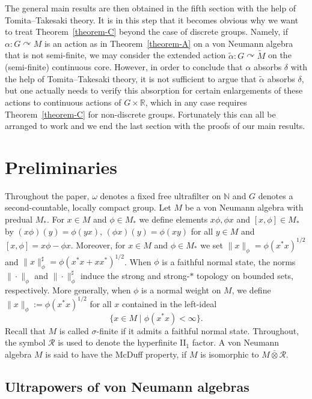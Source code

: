 \documentclass[11pt,a4paper]{article}
\theoremstyle{definition}
\theoremstyle{remark}
\numberwithin{equation}{section}
\numberwithin{theorem}{section}
\newcommand{\N}{\mathbb{N}}
\renewcommand{\tilde}{\widetilde}
\begin{document}
The general main results are then obtained in the fifth section with the help of Tomita--Takesaki theory.
It is in this step that it becomes obvious why we want to treat Theorem~\ref{theorem-C} beyond the case of discrete groups.
Namely, if $\alpha\colon G\curvearrowright M$ is an action as in Theorem~\ref{theorem-A} on a von Neumann algebra that is not semi-finite, we may consider the extended action $\tilde{\alpha}\colon G\curvearrowright\tilde{M}$ on the (semi-finite) continuous core.
However, in order to conclude that $\alpha$ absorbs $\delta$ with the help of Tomita--Takesaki theory, it is not sufficient to argue that $\tilde{\alpha}$ absorbs $\delta$, but one actually needs to verify this absorption for certain enlargements of these actions to continuous actions of $G\times\mathbb{R}$, which in any case requires Theorem~\ref{theorem-C} for non-discrete groups.
Fortunately this can all be arranged to work and we end the last section with the proofs of our main results.


\section{Preliminaries}

Throughout the paper, $\omega$ denotes a fixed free ultrafilter on $\N$ and $G$ denotes a second-countable, locally compact group.
Let $M$ be a von Neumann algebra with predual $M_*$. For $x \in M$ and $\phi \in M_*$ we define elements $x\phi, \phi x$ and $[x,\phi] \in M_*$ by $(x\phi)(y) = \phi(yx)$, $(\phi x)(y) = \phi(xy)$ for all $y \in M$ and $[x,\phi] = x\phi - \phi x$. Moreover, for $x \in M$ and $\phi \in M_*$ we set $\|x\|_{\phi} = \phi(x^*x)^{1/2}$ and $\|x\|_{\phi}^\sharp = \phi(x^*x + xx^*)^{1/2}$. When $\phi$ is a faithful normal state, the norms $\|\cdot\|_\phi$ and $\|\cdot\|_\phi^\sharp$ induce the strong and strong-$*$ topology on bounded sets, respectively.
%
More generally, when $\phi$ is a normal weight on $M$, we define $\|x\|_{\phi}:= \phi(x^*x)^{1/2}$ for all $x$ contained in the left-ideal
\[\{x  \in M \mid \phi(x^*x) < \infty\}.\]
%
Recall that $M$ is called $\sigma$-finite if it admits a faithful normal state.
Throughout, the symbol $\mathcal R$ is used to denote the hyperfinite II$_1$ factor.
A von Neumann algebra $M$ is said to have the McDuff property, if $M$ is isomorphic to $M\bar{\otimes}\mathcal R$.

\subsection{Ultrapowers of von Neumann algebras}
\end{document}
